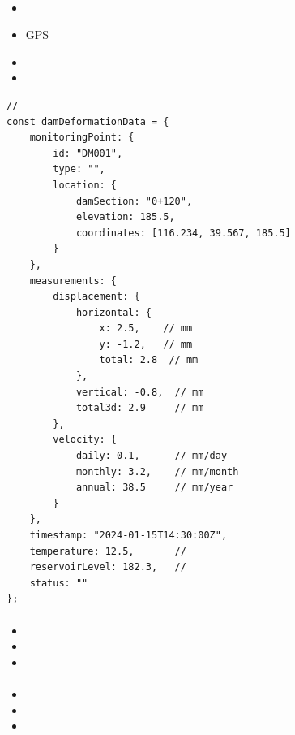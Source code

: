 \hypertarget{section-50}{%
\paragraph{}\label{section-50}}

\begin{itemize}
\item
  \important{}
\item
  \important{}GPS
\item
  \important{}
\item
  \important{}
\end{itemize}

\begin{lstlisting}[style=javascript]
// 
const damDeformationData = {
    monitoringPoint: {
        id: "DM001",
        type: "",
        location: {
            damSection: "0+120",
            elevation: 185.5,
            coordinates: [116.234, 39.567, 185.5]
        }
    },
    measurements: {
        displacement: {
            horizontal: {
                x: 2.5,    // mm
                y: -1.2,   // mm
                total: 2.8  // mm
            },
            vertical: -0.8,  // mm
            total3d: 2.9     // mm
        },
        velocity: {
            daily: 0.1,      // mm/day
            monthly: 3.2,    // mm/month
            annual: 38.5     // mm/year
        }
    },
    timestamp: "2024-01-15T14:30:00Z",
    temperature: 12.5,       // 
    reservoirLevel: 182.3,   // 
    status: ""
};
\end{lstlisting}

\hypertarget{section-51}{%
\paragraph{}\label{section-51}}

\begin{itemize}
\item
  \important{}
\item
  \important{}
\item
  \important{}
\end{itemize}

\hypertarget{section-52}{%
\paragraph{}\label{section-52}}

\begin{itemize}
\item
  \important{}
\item
  \important{}
\item
  \important{}
\end{itemize}


